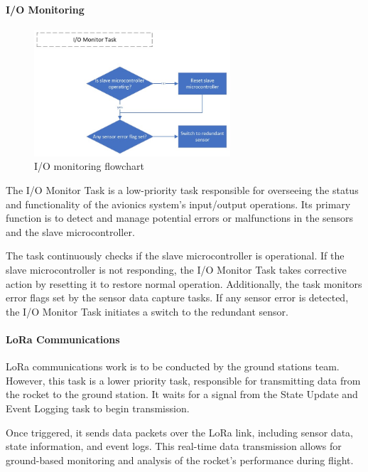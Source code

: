 \paragraph{I/O Monitoring}
\begin{figure}[ht!]
  \begin{center}
    \hspace{-3.5cm}\includegraphics[width=0.65\textwidth]{./img/Section_4_2_2_4.jpeg}
  \end{center}
  \caption{I/O monitoring flowchart}\label{fig:flowchart-IO}
\end{figure}

The I/O Monitor Task is a low-priority task responsible for overseeing the status and functionality of the avionics system's input/output operations. Its primary function is to detect and manage potential errors or malfunctions in the sensors and the slave microcontroller. 

The task continuously checks if the slave microcontroller is operational. If the slave microcontroller is not responding, the I/O Monitor Task takes corrective action by resetting it to restore normal operation. Additionally, the task monitors error flags set by the sensor data capture tasks. If any sensor error is detected, the I/O Monitor Task initiates a switch to the redundant sensor. 

\paragraph{LoRa Communications}
LoRa communications work is to be conducted by the ground stations team. However, this task is a lower priority task, responsible for transmitting data from the rocket to the ground station. It waits for a signal from the State Update and Event Logging task to begin transmission. 

Once triggered, it sends data packets over the LoRa link, including sensor data, state information, and event logs. This real-time data transmission allows for ground-based monitoring and analysis of the rocket's performance during flight. 

